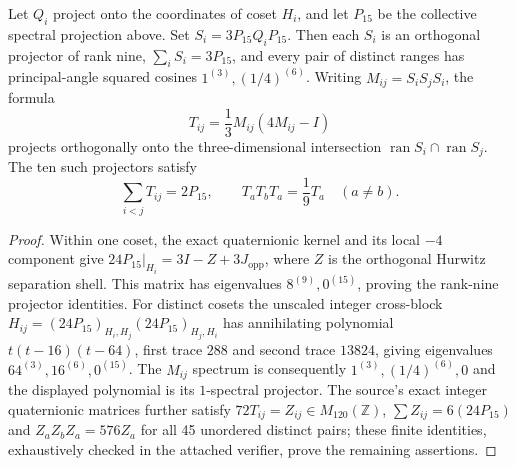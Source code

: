 \documentclass[11pt]{article}
\begin{document}
\begin{theorem}
\label{p1b:thm:fivecoset-nineplane-fusion}
Let $Q_i$ project onto the coordinates of coset $H_i$, and let
$P_{15}$ be the collective spectral projection above. Set
$S_i=3P_{15}Q_iP_{15}$. Then each $S_i$ is an orthogonal projector
of rank nine, $\sum_iS_i=3P_{15}$, and every pair of distinct
ranges has principal-angle squared cosines $1^{(3)},(1/4)^{(6)}$.
Writing $M_{ij}=S_iS_jS_i$, the formula
\[
T_{ij}=\frac13M_{ij}(4M_{ij}-I)
\]
projects orthogonally onto the three-dimensional intersection
$\operatorname{ran}S_i\cap\operatorname{ran}S_j$. The ten such
projectors satisfy
\[
\sum_{i<j}T_{ij}=2P_{15},\qquad
T_aT_bT_a=\frac19T_a\quad(a\ne b).
\]
\end{theorem}
\begin{proof}
Within one coset, the exact quaternionic kernel and its local
$-4$ component give
$24P_{15}|_{H_i}=3I-Z+3J_{\mathrm{opp}}$, where $Z$ is
the orthogonal Hurwitz separation shell. This matrix has eigenvalues
$8^{(9)},0^{(15)}$, proving the rank-nine projector identities.
For distinct cosets the unscaled integer cross-block
$H_{ij}=(24P_{15})_{H_i,H_j}(24P_{15})_{H_j,H_i}$ has annihilating
polynomial $t(t-16)(t-64)$, first trace $288$ and second trace
$13824$, giving eigenvalues $64^{(3)},16^{(6)},0^{(15)}$.
The $M_{ij}$ spectrum is consequently $1^{(3)},(1/4)^{(6)},0$
and the displayed polynomial is its $1$-spectral projector.
The source's exact integer quaternionic matrices further satisfy
$72T_{ij}=Z_{ij}\in M_{120}(\mathbb Z)$,
$\sum Z_{ij}=6(24P_{15})$ and
$Z_aZ_bZ_a=576Z_a$ for all 45 unordered distinct pairs; these
finite identities, exhaustively checked in the attached verifier,
prove the remaining assertions.
\end{proof}
\end{document}
